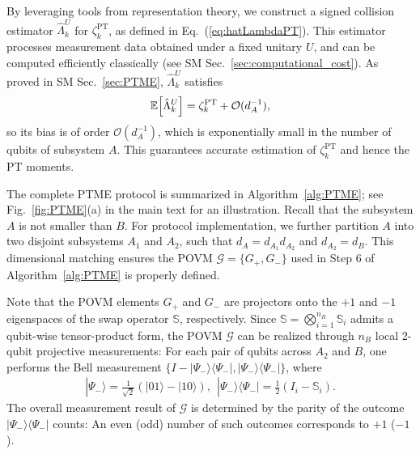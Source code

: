\documentclass[aps,prl,twocolumn,nofootinbib,superscriptaddress,10pt]{revtex4-2}
\let\originalleft\left
\let\originalright\right
\renewcommand{\left}{\mathopen{}\mathclose\bgroup\originalleft}
\renewcommand{\right}{\aftergroup\egroup\originalright}
\def\>{\rangle}
\def\<{\langle}
\theoremstyle{plain}
\theoremstyle{definition}
\newcommand{\PT}{\mathrm{PT}}
\newcommand{\eref}[1]{Eq.~\textup{(\ref{#1})}}
\begin{document}
By leveraging tools from representation theory, 
we construct a signed collision estimator $\hat{\Lambda}_k^{U}$ for $\zeta_k^{\PT}$, as defined in \eref{eq:hatLambdaPT}. 
This estimator processes measurement data obtained under a fixed unitary $U$, and can be computed efficiently classically (see SM Sec.~\ref{sec:computational_cost}). 
As proved in SM Sec.~\ref{sec:PTME}, $\hat{\Lambda}_k^{U}$ satisfies
\begin{align}\label{eq:ELambdakU}
	\mathbb{E}\left[ \hat{\Lambda}_k^{U} \right]
	= \zeta_k^{\PT} + \mathcal{O}(d_A^{-1}),   
\end{align}
so its bias is of order \(\mathcal{O}(d_A^{-1})\), which is exponentially small in the number of qubits of subsystem \(A\).
This guarantees accurate estimation of $\zeta_k^{\PT}$ and hence the PT moments.



The complete PTME protocol is summarized in  Algorithm~\ref{alg:PTME}; see Fig.~\ref{fig:PTME}(a) in the main text for an illustration. 
Recall that the subsystem $A$ is not smaller than $B$. 
For protocol implementation, we further partition $A$ into two disjoint subsystems $A_1$ and $A_2$, such that $d_A=d_{A_1}d_{A_2}$ and $d_{A_2}=d_B$.
This dimensional matching ensures the POVM $\mathcal{G}=\{G_+, G_-\}$  used in Step 6 of Algorithm~\ref{alg:PTME} is properly defined.


Note that the POVM elements $G_{+}$ and $G_{-}$ are projectors onto the $+1$ and $-1$  eigenspaces of the swap operator $\mathbb{S}$, respectively. 
Since $\mathbb{S}=\bigotimes_{i=1}^{n_B}\mathbb{S}_i$ admits a qubit-wise tensor-product form, 
the POVM $\mathcal{G}$ can be realized through $n_B$ local 2-qubit projective measurements: For each pair of qubits across $A_2$ and $B$, one performs the Bell measurement 
$\{I-|\Psi_-\>\<\Psi_-|,|\Psi_-\>\<\Psi_-|\}$, where
\begin{align}
|\Psi_-\>= \frac{1}{\sqrt{2}} (|01\>-|10\>), 
\ \ 
|\Psi_-\>\<\Psi_-|
= \frac{1}{2}(I_i-\mathbb{S}_i) . 
\end{align}
The overall  measurement result of $\mathcal{G}$ is determined by the parity of the outcome $|\Psi_-\rangle\langle\Psi_-|$ counts: An even (odd) number of such outcomes corresponds to $+1$ ($-1$). 



\end{document}
